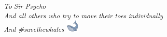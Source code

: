 \thispagestyle{plain}

\begin{flushright}
    \Large\em\null\vskip5cm To Sir Psycho \\
    \large And all others who try to move their toes individually\\
    \large And \#savethewhales \includegraphics{../plots/emojis/1F40B.pdf}
\end{flushright}

